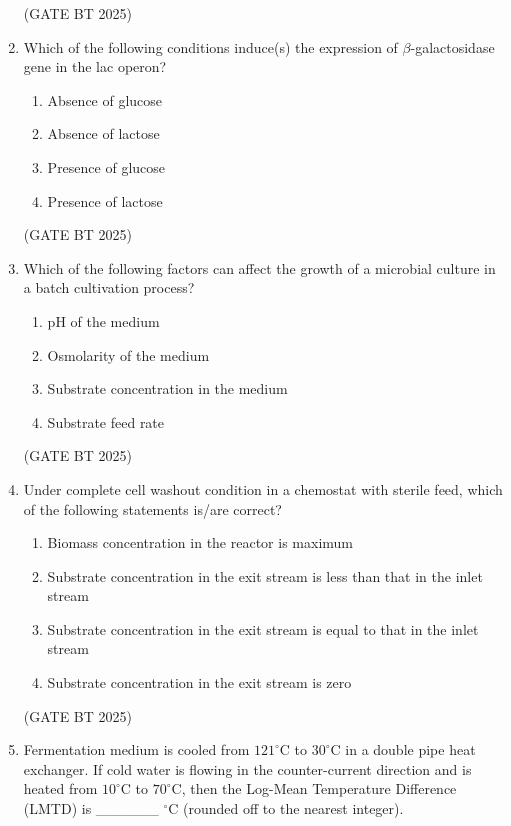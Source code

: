 \documentclass[journal,12pt,onecolumn]{IEEEtran}
\theoremstyle{remark}
\begin{document}
\begin{enumerate}
\hfill (GATE BT 2025)

\item Which of the following conditions induce(s) the expression of $\beta$-galactosidase gene in the lac operon?

\begin{enumerate}
\item Absence of glucose 
\item Absence of lactose 
\item Presence of glucose 
\item Presence of lactose
\end{enumerate}

\hfill (GATE BT 2025)

\item Which of the following factors can affect the growth of a microbial culture in a batch cultivation process?

\begin{enumerate}
\item pH of the medium 
\item Osmolarity of the medium 
\item Substrate concentration in the medium 
\item Substrate feed rate
\end{enumerate}

\hfill (GATE BT 2025)

\item Under complete cell washout condition in a chemostat with sterile feed, which of the following statements is/are correct?  

\begin{enumerate}
    \item Biomass concentration in the reactor is maximum  
    \item Substrate concentration in the exit stream is less than that in the inlet stream  
    \item Substrate concentration in the exit stream is equal to that in the inlet stream  
    \item Substrate concentration in the exit stream is zero  
\end{enumerate}

\hfill (GATE BT 2025)

\item Fermentation medium is cooled from $121^\circ$C to $30^\circ$C in a double pipe heat exchanger. If cold water is flowing in the counter-current direction and is heated from $10^\circ$C to $70^\circ$C, then the Log-Mean Temperature Difference (LMTD) is \_\_\_\_\_\_ $^\circ$C (rounded off to the nearest integer).


\end{enumerate}
\end{document}

